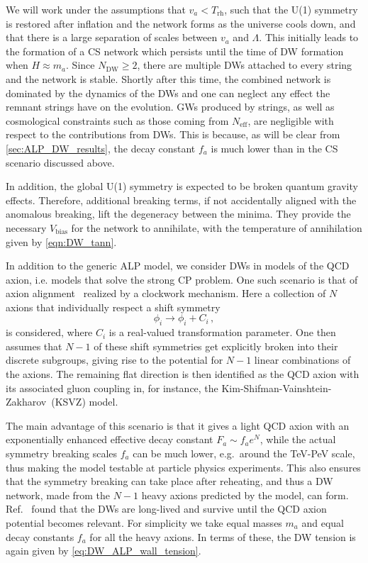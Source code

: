 \documentclass{article}
\begin{document}
We will work under the assumptions that $v_{a}<T_\mathrm{rh}$, such that the U(1) symmetry is restored after inflation and the network forms as the universe cools down, and that there is a large separation of scales between $v_{a}$ and $\Lambda$. This initially leads to the formation of a CS network which persists until the time of DW formation when $H\approx m_a$.  Since $N_\mathrm{DW}\geq2$, there are multiple DWs attached to every string and the network is stable.
Shortly after this time, the combined network is dominated by the dynamics of the DWs and one can neglect any effect the remnant strings have on the evolution. GWs produced by strings, as well as cosmological constraints such as those coming from $N_\mathrm{eff}$, are negligible with respect to the contributions from DWs.
This is because, as will be clear from \cref{sec:ALP_DW_results}, the decay constant $f_a$ is much lower than in the CS scenario discussed above. 

In addition, the global U(1) symmetry is expected to be broken quantum gravity effects.
Therefore, additional breaking terms, if not accidentally aligned with the anomalous breaking, lift the degeneracy between the minima. They provide the necessary $V_\mathrm{bias}$ for the network to annihilate, with the temperature of annihilation given by \cref{eqn:DW_tann}.

\bigskip 

In addition to the generic ALP model, we consider DWs in models of the QCD axion, i.e. models that solve the strong CP problem. One such scenario is that of axion alignment~\cite{Higaki:2016jjh} realized by a clockwork mechanism.
Here a collection of $N$ axions that individually respect a shift symmetry
\begin{equation}
\phi_{i} \rightarrow \phi_{i} + C_{i}\,,    
\end{equation} 
is considered,
where $C_{i}$ is a real-valued transformation parameter. One then assumes that  $N-1$ of these shift symmetries get explicitly broken into their discrete subgroups, giving rise to the potential for $N-1$ linear combinations of the axions. The remaining flat direction is then identified as the QCD axion with its associated gluon coupling in, for instance, the Kim-Shifman-Vainshtein-Zakharov~(KSVZ) model. 

The main advantage of this scenario is that it gives a light QCD axion with an exponentially enhanced effective decay constant $F_a \sim f_a e^{N}$, while the actual symmetry breaking scales $f_a$ can be much lower, e.g.~around the TeV-PeV scale, thus making the model testable at particle physics experiments. This also ensures that the symmetry breaking can take place after reheating, and thus a DW network, made from the $N-1$ heavy axions predicted by the model, can form. 
Ref.~\cite{Higaki:2016jjh} found that the DWs are long-lived and survive until the QCD axion potential becomes relevant. For simplicity we take equal masses $m_a$ and equal decay constants $f_a$ for all the heavy axions. In terms of these, the DW tension is again given by \cref{eq:DW_ALP_wall_tension}. 
\end{document}

